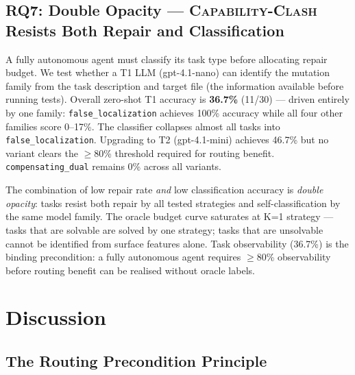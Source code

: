 \documentclass[sigconf,review,anonymous]{acmart}
\newcommand{\ccbench}{\textsc{Capability-Clash}}
\begin{document}
\subsection{RQ7: Double Opacity — \ccbench{} Resists Both Repair and Classification}
\label{sec:rq7}

A fully autonomous agent must classify its task type before allocating repair budget. We test whether a T1 LLM (gpt-4.1-nano) can identify the mutation family from the task description and target file (the information available before running tests). Overall zero-shot T1 accuracy is \textbf{36.7\%} (11/30) — driven entirely by one family: \texttt{false\_localization} achieves 100\% accuracy while all four other families score 0--17\%. The classifier collapses almost all tasks into \texttt{false\_localization}. Upgrading to T2 (gpt-4.1-mini) achieves 46.7\% but no variant clears the $\geq$80\% threshold required for routing benefit. \texttt{compensating\_dual} remains 0\% across all variants.

The combination of low repair rate \emph{and} low classification accuracy is \emph{double opacity}: tasks resist both repair by all tested strategies and self-classification by the same model family. The oracle budget curve saturates at K=1 strategy — tasks that are solvable are solved by one strategy; tasks that are unsolvable cannot be identified from surface features alone. Task observability (36.7\%) is the binding precondition: a fully autonomous agent requires $\geq$80\% observability before routing benefit can be realised without oracle labels.

\section{Discussion}

\subsection{The Routing Precondition Principle}
\end{document}
